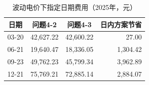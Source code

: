 \par
\begin{table}[!htbp]
\centering
\caption{波动电价下指定日期费用（2025年，元）}\label{tab:q4-days-summary}
\normalsize
\begin{tabular}{lrrr}
\toprule
\multicolumn{1}{c}{日期} & \multicolumn{1}{c}{问题4-2} & \multicolumn{1}{c}{问题4-3} & \multicolumn{1}{c}{日内方案节省} \\
\midrule
03-20 & 42,627.22 & 42,600.22 & 27.00 \\
06-21 & 19,640.47 & 18,336.05 & 1,304.42 \\
09-23 & 49,762.23 & 45,799.34 & 3,962.89 \\
12-21 & 75,769.21 & 72,885.14 & 2,884.07 \\
\bottomrule
\end{tabular}
\end{table}
\par
